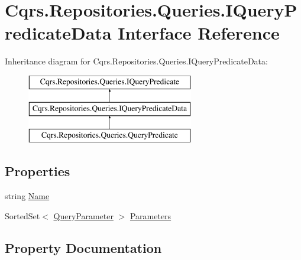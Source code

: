 \hypertarget{interfaceCqrs_1_1Repositories_1_1Queries_1_1IQueryPredicateData}{}\section{Cqrs.\+Repositories.\+Queries.\+I\+Query\+Predicate\+Data Interface Reference}
\label{interfaceCqrs_1_1Repositories_1_1Queries_1_1IQueryPredicateData}
Inheritance diagram for Cqrs.\+Repositories.\+Queries.\+I\+Query\+Predicate\+Data\+:\begin{figure}[H]
\begin{center}
\leavevmode
\includegraphics[height=3.000000cm]{interfaceCqrs_1_1Repositories_1_1Queries_1_1IQueryPredicateData}
\end{center}
\end{figure}
\subsection*{Properties}
\begin{DoxyCompactItemize}
\item 
string \hyperlink{interfaceCqrs_1_1Repositories_1_1Queries_1_1IQueryPredicateData_a88461542ea0befb00874ebbb086387aa}{Name}
\item 
Sorted\+Set$<$ \hyperlink{classCqrs_1_1Repositories_1_1Queries_1_1QueryParameter}{Query\+Parameter} $>$ \hyperlink{interfaceCqrs_1_1Repositories_1_1Queries_1_1IQueryPredicateData_a7a79d734568d6ef5f9b2446bd0e99894}{Parameters}
\end{DoxyCompactItemize}


\subsection{Property Documentation}
\mbox{\label{interfaceCqrs_1_1Repositories_1_1Queries_1_1IQueryPredicateData_a88461542ea0befb00874ebbb086387aa}} 

